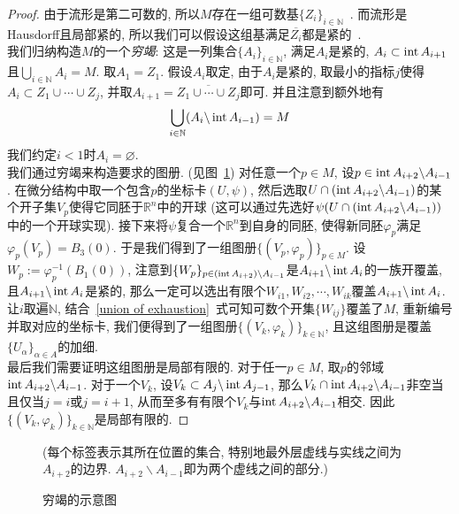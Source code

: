 \begin{proof}
    由于流形是第二可数的, 所以$M$存在一组可数基$\{Z_i\}_{i\in\mathbb{N}}$~\parencite[定理2.50]{Lee_IntroTopoMani}.
    而流形是Hausdorff且局部紧的, 所以我们可以假设这组基满足$\overline{Z_i}$都是紧的~\parencite[命题4.63]{Lee_IntroTopoMani}.\\
    我们归纳构造$M$的一个\textit{穷竭}: 这是一列集合$\{A_i\}_{i\in\mathbb{N}}$, 满足$A_i$是紧的, $A_i\subset\operatorname{int} A_{i+1}$且$\displaystyle\bigcup_{i\in\mathbb{N}}A_i=M$.
    取$A_1=Z_1$. 假设$A_i$取定, 由于$A_i$是紧的, 取最小的指标$j$使得$A_i\subset Z_1\cup\cdots\cup Z_j$, 并取$A_{i+1}=\overline{Z_1\cup\cdots\cup Z_j}$即可.
    并且注意到额外地有
    \begin{equation}
        \bigcup_{i\in\mathbb{N}}(A_{i}\backslash\operatorname{int}{A_{i-1}})=M\label{union of exhaustion}
    \end{equation}
    我们约定$i<1$时$A_i=\varnothing$.\\
    我们通过穷竭来构造要求的图册. (见图~\ref{figure of exhaustion})
    对任意一个$p\in M$, 设$p\in\operatorname{int} A_{i+2}\backslash A_{i-1}$.
    在微分结构中取一个包含$p$的坐标卡$(U,\psi)$, 然后选取$U\cap(\operatorname{int} A_{i+2}\backslash A_{i-1})$的某个开子集$V_p$使得它同胚于$\mathbb{R}^n$中的开球 (这可以通过先选好$\psi(U\cap(\operatorname{int} A_{i+2}\backslash A_{i-1}))$中的一个开球实现).
    接下来将$\psi$复合一个$\mathbb{R}^n$到自身的同胚, 使得新同胚$\varphi_p$满足$\varphi_p(V_p)=B_3(0)$.
    于是我们得到了一组图册$\{(V_p,\varphi_p)\}_{p\in M}$.
    设$W_p:=\varphi^{-1}_p(B_1(0))$, 注意到$\{W_p\}_{p\in(\operatorname{int} A_{i+2})\backslash A_{i-1}}$是$A_{i+1}\backslash\operatorname{int}{A_i}$的一族开覆盖, 且$A_{i+1}\backslash\operatorname{int}{A_i}$是紧的, 那么一定可以选出有限个$W_{i1},W_{i2},\cdots,W_{ik}$覆盖$A_{i+1}\backslash\operatorname{int}{A_i}$.
    让$i$取遍$\mathbb{N}$, 结合~\eqref{union of exhaustion}~式可知可数个开集$\{W_{ij}\}$覆盖了$M$, 重新编号并取对应的坐标卡, 我们便得到了一组图册$\{(V_k,\varphi_k)\}_{k\in\mathbb{N}}$, 且这组图册是覆盖$\{U_\alpha\}_{\alpha\in A}$的加细.\\
    最后我们需要证明这组图册是局部有限的.
    对于任一$p\in M$, 取$p$的邻域$\operatorname{int} A_{i+2}\backslash A_{i-1}$.
    对于一个$V_k$, 设$V_k\subset A_j\backslash\operatorname{int}{A_{j-1}}$, 那么$V_k\cap\operatorname{int} A_{i+2}\backslash A_{i-1}$非空当且仅当$j=i$或$j=i+1$, 从而至多有有限个$V_k$与$\operatorname{int} A_{i+2}\backslash A_{i-1}$相交.
    因此$\{(V_k,\varphi_k)\}_{k\in\mathbb{N}}$是局部有限的.
\end{proof}

\begin{figure}[ht]
    \centering\label{figure of exhaustion}
    
    \caption{穷竭的示意图}
    (每个标签表示其所在位置的集合, 特别地最外层虚线与实线之间为$A_{i+2}$的边界. $A_{i+2}\backslash A_{i-1}$即为两个虚线之间的部分.)
\end{figure}

